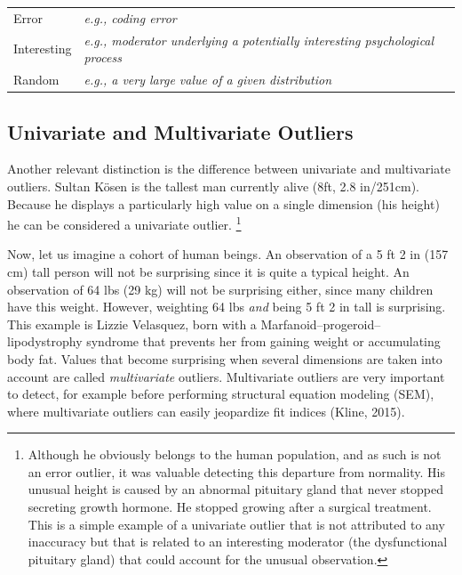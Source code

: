 \documentclass[man,floatsintext]{apa6}
\let\rmarkdownfootnote\footnote%
\def\footnote{\protect\rmarkdownfootnote}
\begin{document}
\begin{longtable}[]{@{}ll@{}}
\toprule
\endhead
\begin{minipage}[t]{0.15\columnwidth}\raggedright
Error\strut
\end{minipage} & \begin{minipage}[t]{0.79\columnwidth}\raggedright
\emph{e.g., coding error}\strut
\end{minipage}\tabularnewline
\begin{minipage}[t]{0.15\columnwidth}\raggedright
Interesting\strut
\end{minipage} & \begin{minipage}[t]{0.79\columnwidth}\raggedright
\emph{e.g., moderator underlying a potentially interesting psychological process}\strut
\end{minipage}\tabularnewline
\begin{minipage}[t]{0.15\columnwidth}\raggedright
Random\strut
\end{minipage} & \begin{minipage}[t]{0.79\columnwidth}\raggedright
\emph{e.g., a very large value of a given distribution}\strut
\end{minipage}\tabularnewline
\bottomrule
\end{longtable}

\hypertarget{univariate-and-multivariate-outliers}{%
\subsection{Univariate and Multivariate Outliers}\label{univariate-and-multivariate-outliers}}

Another relevant distinction is the difference between univariate and multivariate outliers. Sultan Kösen is the tallest man currently alive (8ft, 2.8 in/251cm). Because he displays a particularly high value on a single dimension (his height) he can be considered a univariate outlier. \footnote{Although he obviously belongs to the human population, and as such is not an error outlier, it was valuable detecting this departure from normality. His unusual height is caused by an abnormal pituitary gland that never stopped secreting growth hormone. He stopped growing after a surgical treatment. This is a simple example of a univariate outlier that is not attributed to any inaccuracy but that is related to an interesting moderator (the dysfunctional pituitary gland) that could account for the unusual observation.}

Now, let us imagine a cohort of human beings. An observation of a 5 ft 2 in (157 cm) tall person will not be surprising since it is quite a typical height. An observation of 64 lbs (29 kg) will not be surprising either, since many children have this weight. However, weighting 64 lbs \emph{and} being 5 ft 2 in tall is surprising. This example is Lizzie Velasquez, born with a Marfanoid--progeroid--lipodystrophy syndrome that prevents her from gaining weight or accumulating body fat. Values that become surprising when several dimensions are taken into account are called \emph{multivariate} outliers. Multivariate outliers are very important to detect, for example before performing structural equation modeling (SEM), where multivariate outliers can easily jeopardize fit indices (Kline, 2015).
\end{document}
